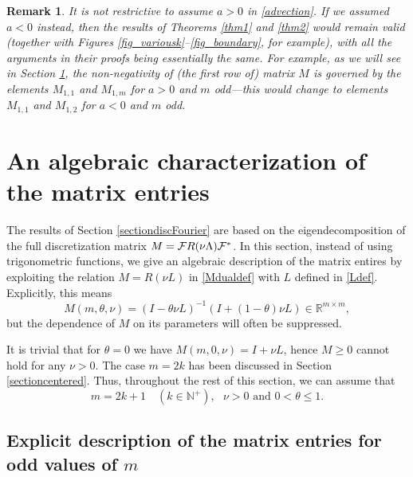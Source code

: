 \documentclass[a4paper]{article}
\newtheorem{remark}{Remark}
\newcommand{\te}{\theta}
\newcommand{\nplus}{\mathbb{N}^+}
\newcommand{\cF}{{\cal{F}}}
\begin{document}
\begin{remark}
It is not restrictive to assume $a>0$ in \eqref{advection}. If we assumed $a<0$ instead, then the results of Theorems \ref{thm1} and \ref{thm2} would remain valid (together with Figures \ref{fig_variousk}--\ref{fig_boundary}, for example), with all the arguments in their proofs being essentially the same.  For example, as we will see in Section \ref{section3}, the non-negativity of (the first row of) matrix $M$ is governed by the elements $M_{1,1}$ and $M_{1,m}$ for $a>0$ and $m$ odd---this would change to elements $M_{1,1}$ and $M_{1,2}$ for $a<0$ and $m$ odd.
\end{remark}






\section{An algebraic characterization of the matrix entries}\label{section3}

The results of Section \ref{sectiondiscFourier} are based on the eigendecomposition of the full discretization matrix $M=\cF R(\nu \Lambda) \cF^*$. In this section, instead of using trigonometric functions, we give an algebraic description of the matrix entires by exploiting the relation $M=R(\nu L)$ in \eqref{Mdualdef} with $L$ defined in \eqref{Ldef}.
Explicitly, this means 
\begin{equation}\label{Mdef}
M(m,\te,\nu)=(I-\te\nu L)^{-1}(I+(1-\te)\nu L)\in\mathbb{R}^{m\times m},
\end{equation}
but the dependence of $M$ on its parameters will often be suppressed. 

It is trivial that for $\te=0$ we have $M(m,0,\nu)=I+\nu L$, hence $M\ge 0$ cannot hold for any $\nu>0$. The case $m=2k$ has been discussed in Section \ref{sectioncentered}. Thus, throughout the rest of this section, we can assume that 
\begin{equation}\label{genassump}
\boxed{ 
m=2k+1\quad (k\in\nplus), \ \ \ \nu>0 \text{\ \  and\ \  } 0<\te\le 1.}
\end{equation}

\subsection{Explicit description of the matrix entries for odd values of $m$}\label{explsect}
\end{document}
